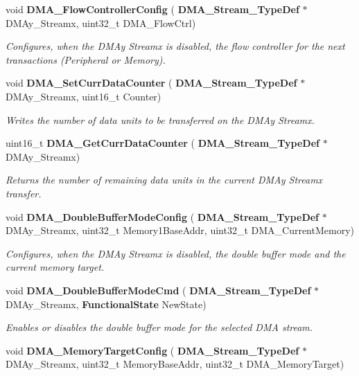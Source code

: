 \begin{DoxyCompactItemize}
void \textbf{ D\+M\+A\+\_\+\+Flow\+Controller\+Config} (\textbf{ D\+M\+A\+\_\+\+Stream\+\_\+\+Type\+Def} $\ast$D\+M\+Ay\+\_\+\+Streamx, uint32\+\_\+t D\+M\+A\+\_\+\+Flow\+Ctrl)
\begin{DoxyCompactList}\small\item\em Configures, when the D\+M\+Ay Streamx is disabled, the flow controller for the next transactions (Peripheral or Memory). \end{DoxyCompactList}\item 
void \textbf{ D\+M\+A\+\_\+\+Set\+Curr\+Data\+Counter} (\textbf{ D\+M\+A\+\_\+\+Stream\+\_\+\+Type\+Def} $\ast$D\+M\+Ay\+\_\+\+Streamx, uint16\+\_\+t Counter)
\begin{DoxyCompactList}\small\item\em Writes the number of data units to be transferred on the D\+M\+Ay Streamx. \end{DoxyCompactList}\item 
uint16\+\_\+t \textbf{ D\+M\+A\+\_\+\+Get\+Curr\+Data\+Counter} (\textbf{ D\+M\+A\+\_\+\+Stream\+\_\+\+Type\+Def} $\ast$D\+M\+Ay\+\_\+\+Streamx)
\begin{DoxyCompactList}\small\item\em Returns the number of remaining data units in the current D\+M\+Ay Streamx transfer. \end{DoxyCompactList}\item 
void \textbf{ D\+M\+A\+\_\+\+Double\+Buffer\+Mode\+Config} (\textbf{ D\+M\+A\+\_\+\+Stream\+\_\+\+Type\+Def} $\ast$D\+M\+Ay\+\_\+\+Streamx, uint32\+\_\+t Memory1\+Base\+Addr, uint32\+\_\+t D\+M\+A\+\_\+\+Current\+Memory)
\begin{DoxyCompactList}\small\item\em Configures, when the D\+M\+Ay Streamx is disabled, the double buffer mode and the current memory target. \end{DoxyCompactList}\item 
void \textbf{ D\+M\+A\+\_\+\+Double\+Buffer\+Mode\+Cmd} (\textbf{ D\+M\+A\+\_\+\+Stream\+\_\+\+Type\+Def} $\ast$D\+M\+Ay\+\_\+\+Streamx, \textbf{ Functional\+State} New\+State)
\begin{DoxyCompactList}\small\item\em Enables or disables the double buffer mode for the selected D\+MA stream. \end{DoxyCompactList}\item 
void \textbf{ D\+M\+A\+\_\+\+Memory\+Target\+Config} (\textbf{ D\+M\+A\+\_\+\+Stream\+\_\+\+Type\+Def} $\ast$D\+M\+Ay\+\_\+\+Streamx, uint32\+\_\+t Memory\+Base\+Addr, uint32\+\_\+t D\+M\+A\+\_\+\+Memory\+Target)

\end{DoxyCompactItemize}
